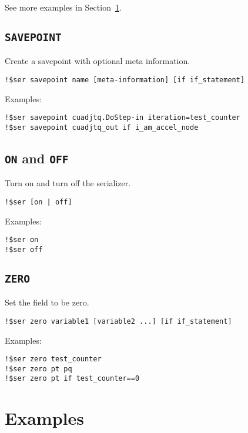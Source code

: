 \documentclass{article}
\begin{document}
See more examples in Section~\ref{sec:examples}.

\subsection{\texttt{SAVEPOINT}}
Create a savepoint with optional meta information.

\begin{lstlisting}
!$ser savepoint name [meta-information] [if if_statement]
\end{lstlisting}

Examples:
\begin{lstlisting}
!$ser savepoint cuadjtq.DoStep-in iteration=test_counter
!$ser savepoint cuadjtq_out if i_am_accel_node
\end{lstlisting}


\subsection{\texttt{ON} and \texttt{OFF}}
Turn on and turn off the serializer.
\begin{lstlisting}
!$ser [on | off]
\end{lstlisting}

Examples:
\begin{lstlisting}
!$ser on
!$ser off
\end{lstlisting}

\subsection{\texttt{ZERO}}
Set the field to be zero.
\begin{lstlisting}
!$ser zero variable1 [variable2 ...] [if if_statement]
\end{lstlisting}

Examples:
\begin{lstlisting}
!$ser zero test_counter
!$ser zero pt pq
!$ser zero pt if test_counter==0
\end{lstlisting}

\section{Examples}
\label{sec:examples}
\end{document}
